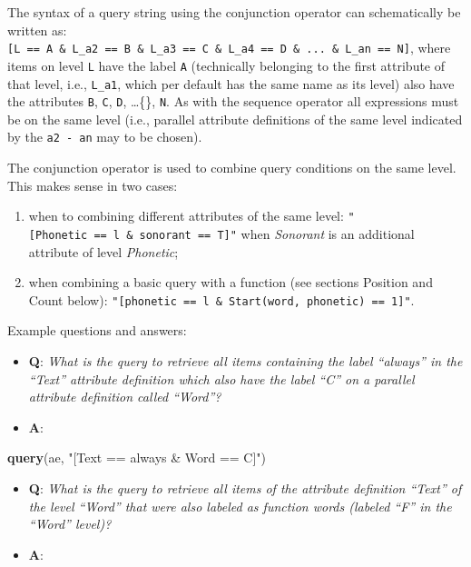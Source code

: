 \documentclass[]{book}
\newenvironment{Shaded}{\begin{snugshade}}{\end{snugshade}}
\newcommand{\KeywordTok}[1]{\textcolor[rgb]{0.13,0.29,0.53}{\textbf{#1}}}
\newcommand{\NormalTok}[1]{#1}
\newcommand{\StringTok}[1]{\textcolor[rgb]{0.31,0.60,0.02}{#1}}
\providecommand{\tightlist}{%
  \setlength{\itemsep}{0pt}\setlength{\parskip}{0pt}}
\theoremstyle{definition}
\theoremstyle{definition}
\theoremstyle{definition}
\theoremstyle{remark}
\begin{document}
The syntax of a query string using the conjunction operator can
schematically be written as:
\texttt{{[}L\ ==\ A\ \&\ L\_a2\ ==\ B\ \&\ L\_a3\ ==\ C\ \&\ L\_a4\ ==\ D\ \&\ ...\ \&\ L\_an\ ==\ N{]}},
where items on level \texttt{L} have the label \texttt{A} (technically
belonging to the first attribute of that level, i.e., \texttt{L\_a1},
which per default has the same name as its level) also have the
attributes \texttt{B}, \texttt{C}, \texttt{D}, \ldots\{\}, \texttt{N}.
As with the sequence operator all expressions must be on the same level
(i.e., parallel attribute definitions of the same level indicated by the
\texttt{a2\ -\ an} may to be chosen).

The conjunction operator is used to combine query conditions on the same
level. This makes sense in two cases:

\begin{enumerate}
\def\labelenumi{\arabic{enumi}.}
\tightlist
\item
  when to combining different attributes of the same level:
  \texttt{"{[}Phonetic\ ==\ l\ \&\ sonorant\ ==\ T{]}"} when
  \emph{Sonorant} is an additional attribute of level \emph{Phonetic};
\item
  when combining a basic query with a function (see sections Position
  and Count below):
  \texttt{"{[}phonetic\ ==\ l\ \&\ Start(word,\ phonetic)\ ==\ 1{]}"}.
\end{enumerate}

Example questions and answers:

\begin{itemize}
\tightlist
\item
  \textbf{Q}: \emph{What is the query to retrieve all items containing
  the label ``always'' in the ``Text'' attribute definition which also
  have the label ``C'' on a parallel attribute definition called
  ``Word''?}
\item
  \textbf{A}:
\end{itemize}

\begin{Shaded}
\begin{Highlighting}[]
\KeywordTok{query}\NormalTok{(ae, }\StringTok{"[Text == always & Word == C]"}\NormalTok{)}
\end{Highlighting}
\end{Shaded}

\begin{itemize}
\tightlist
\item
  \textbf{Q}: \emph{What is the query to retrieve all items of the
  attribute definition ``Text'' of the level ``Word'' that were also
  labeled as function words (labeled ``F'' in the ``Word'' level)?}
\item
  \textbf{A}:
\end{itemize}
\end{document}
